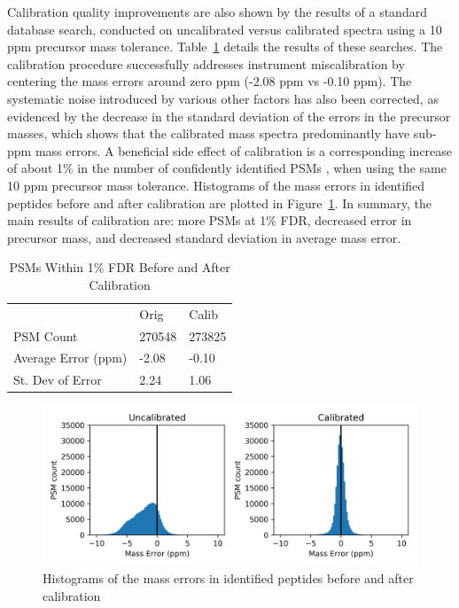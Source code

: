 \documentclass[journal=jprobs,manuscript=article]{achemso}
\begin{document}
Calibration quality improvements are also shown by the results of a standard database search, conducted on uncalibrated versus calibrated spectra using a 10 ppm precursor mass tolerance.
Table~\ref{tbl:calib} details the results of these searches.
The calibration procedure successfully addresses instrument miscalibration by centering the mass errors around zero ppm (-2.08 ppm vs -0.10 ppm).
The systematic noise introduced by various other factors has also been corrected, as evidenced by the decrease in the standard deviation of the errors in the precursor masses, which shows that the calibrated mass spectra predominantly have sub-ppm mass errors.
A beneficial side effect of calibration is a corresponding increase of about 1\% in the number of confidently identified PSMs , when using the same 10 ppm precursor mass tolerance.
Histograms of the mass errors in identified peptides before and after calibration are plotted in Figure~\ref{fgr:fig2-10ppmSearchCalib}.
In summary, the main results of calibration are: more PSMs at 1\% FDR, decreased error in precursor mass, and decreased standard deviation in average mass error.

\begin{table}[]
\centering
\caption{PSMs Within 1\% FDR Before and After Calibration}
\label{tbl:calib}
\begin{tabular}{lll}
                                                                                      & Orig        & Calib        \\
 PSM Count                                                           &      270548   &   273825        \\
 Average Error (ppm)                                                              &      -2.08      &        -0.10      \\
 St. Dev of Error                                                    &       2.24      &        1.06      \\
\end{tabular}
\end{table}

\begin{figure}[H]
 \includegraphics{fig2-10ppmSearchCalib.png}
 \caption{Histograms of the mass errors in identified peptides before and after calibration}
 \label{fgr:fig2-10ppmSearchCalib}
\end{figure}
\end{document}
